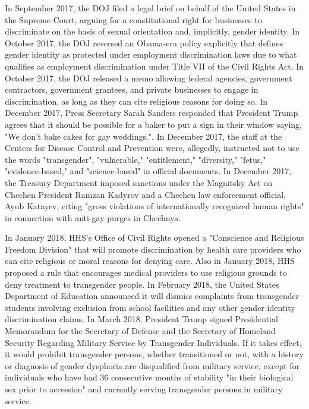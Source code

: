 In September 2017, the DOJ filed a legal brief on behalf of the United
States in the Supreme Court, arguing for a constitutional right for
businesses to discriminate on the basis of sexual orientation and,
implicitly, gender identity. In October 2017, the DOJ reversed an
Obama-era policy explicitly that defines gender identity as protected
under employment discrimination laws due to what qualifies as employment
discrimination under Title VII of the Civil Rights Act. In October 2017,
the DOJ released a memo allowing federal agencies, government
contractors, government grantees, and private businesses to engage in
discrimination, as long as they can cite religious reasons for doing so.
In December 2017, Press Secretary Sarah Sanders responded that President
Trump agrees that it should be possible for a baker to put a sign in
their window saying, "We don't bake cakes for gay weddings.". In
December 2017, the staff at the Centers for Disease Control and
Prevention were, allegedly, instructed not to use the words
"transgender", "vulnerable," "entitlement," "diversity," "fetus,"
"evidence-based," and "science-based" in official documents. In December
2017, the Treasury Department imposed sanctions under the Magnitsky Act
on Chechen President Ramzan Kadyrov and a Chechen law enforcement
official, Ayub Katayev, citing "gross violations of internationally
recognized human rights" in connection with anti-gay purges in Chechnya.

In January 2018, HHS's Office of Civil Rights opened a "Conscience and
Religious Freedom Division" that will promote discrimination by health
care providers who can cite religious or moral reasons for denying care.
Also in January 2018, HHS proposed a rule that encourages medical
providers to use religious grounds to deny treatment to transgender
people. In February 2018, the United States Department of Education
announced it will dismiss complaints from transgender students involving
exclusion from school facilities and any other gender identity
discrimination claims. In March 2018, President Trump signed
Presidential Memorandum for the Secretary of Defense and the Secretary
of Homeland Security Regarding Military Service by Transgender
Individuals. If it takes effect, it would prohibit transgender persons,
whether transitioned or not, with a history or diagnosis of gender
dysphoria are disqualified from military service, except for individuals
who have had 36 consecutive months of stability "in their biological sex
prior to accession" and currently serving transgender persons in
military service.

